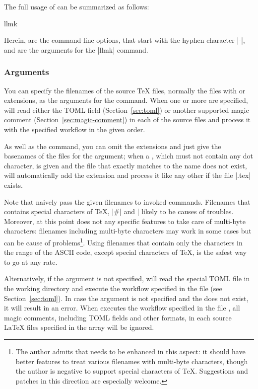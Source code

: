 \documentclass[draft]{llmk-doc}
\begin{document}
The full usage of  can be summarized as follows:
%
\begin{htcode}
llmk  
\end{htcode}

Herein,  are the command-line options, that start with the hyphen
character |-|, and  are the arguments for the |llmk| command.

\subsubsection*{Arguments }

You can specify the filenames of the source {\TeX} files, normally the files
with  or  extensions, as the arguments for the 
command. When one or more  are specified,  will read
either the TOML field (Section~\ref{sec:toml}) or another supported magic
comment (Section~\ref{sec:magic-comment}) in each of the source files and
process it with the specified workflow in the given order.

As well as the  command, you can omit the  extensions and
just give the basenames of the files for the argument; when a ,
which must not contain any dot character, is given and the file that exactly
matches to the name does not exist,  will automatically add the
 extension and process it like any other if the file
|.tex| exists.

Note that  naively pass the given filenames to invoked commands.
Filenames that contains special characters of {\TeX}, \eg |#| and |%
likely to be causes of troubles. Moreover, at this point  does not
any specific features to take care of multi-byte characters: filenames
including multi-byte characters may work in some cases but can be cause of
problems\footnote{The author admits that  needs to be enhanced in
this aspect: it should have better features to treat various filenames with
multi-byte characters, though the author is negative to support special
characters of {\TeX}. Suggestions and patches in this direction are especially
welcome.}. Using filenames that contain only the characters in the range of the
ASCII code, except special characters of {\TeX}, is the safest way to go at any
rate.

Alternatively, if the argument is not specified,  will read the
special TOML file  in the working directory and execute the
workflow specified in the file (see Section~\ref{sec:toml}). In case the
argument is not specified and the  does not exist, it will
result in an error. When  executes the workflow specified in the
file , all magic comments, including TOML fields and other
formats, in each source {\LaTeX} files specified in the  array
will be ignored.
\end{document}
